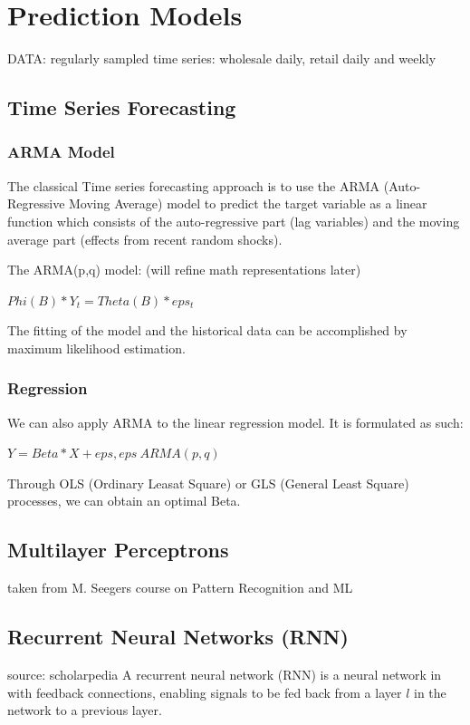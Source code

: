 \section*{Prediction Models}
DATA: regularly sampled time series: wholesale daily, retail daily and weekly

\subsection*{Time Series Forecasting}

\subsubsection*{ARMA Model}
The classical Time series forecasting approach is to use the ARMA (Auto-Regressive
Moving Average) model to predict the target variable as a linear function which
consists of the auto-regressive part (lag variables) and the moving average part
(effects from recent random shocks).

The ARMA(p,q) model: (will refine math representations later)

$Phi(B) * Y_t = Theta(B) * eps_t$

The fitting of the model and the historical
data can be accomplished by maximum likelihood estimation.

\subsubsection*{Regression}
We can also apply ARMA to the linear regression model. It is formulated as such:

$Y = Beta*X + eps,   eps ~ ARMA(p,q)$

Through OLS (Ordinary Leasat Square) or GLS (General Least Square) processes,
we can obtain an optimal Beta.

\subsection*{Multilayer Perceptrons}
taken from M. Seegers course on Pattern Recognition and ML

\subsection*{Recurrent Neural Networks (RNN)}
source: scholarpedia
A recurrent neural network (RNN) is a neural network in with feedback connections, enabling signals to be fed back from a layer $l$ in the network to a previous layer. %

